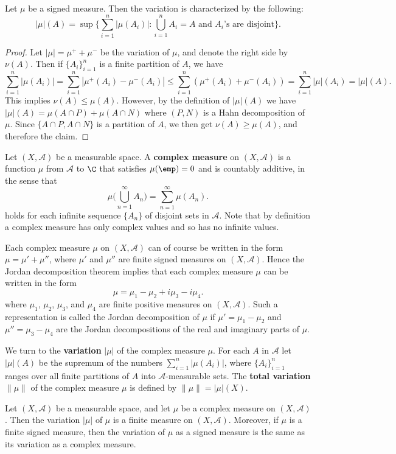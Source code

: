 \begin{proposition}\label{signed measure variation char}
Let $\mu$ be a signed measure. Then the variation is characterized by the following:
\[|\mu|(A)=\sup\{\sum_{i=1}^{n}|\mu(A_i)|:\bigcup_{i=1}^{n}A_i=A\text{ and $A_i$'s are disjoint}\}.\]
\end{proposition}
\begin{proof}
Let $|\mu|=\mu^++\mu^-$ be the variation of $\mu$, and denote the right side by $\nu(A)$. Then if $\{A_i\}_{i=1}^{n}$ is a finite partition of $A$, we have
\[\sum_{i=1}^{n}|\mu(A_i)|=\sum_{i=1}^{n}|\mu^+(A_i)-\mu^-(A_i)|\leq\sum_{i=1}^{n}(\mu^+(A_i)+\mu^-(A_i))=\sum_{i=1}^{n}|\mu|(A_i)=|\mu|(A).\]
This implies $\nu(A)\leq\mu(A)$. However, by the definition of $|\mu|(A)$ we have $|\mu|(A)=\mu(A\cap P)+\mu(A\cap N)$ where $(P,N)$ is a Hahn decomposition of $\mu$. Since $\{A\cap P,A\cap N\}$ is a partition of $A$, we then get $\nu(A)\geq\mu(A)$, and therefore the claim.
\end{proof}
Let $(X,\mathcal{A})$ be a measurable space. A \textbf{complex measure} on $(X,\mathcal{A})$ is a function $\mu$ from $\mathcal{A}$ to $\C$ that satisfies $\mu(\emp)=0$ and is countably additive, in the sense that
\[\mu\Big(\bigcup_{n=1}^{\infty}A_n\Big)=\sum_{n=1}^{\infty}\mu(A_n).\]
holds for each infinite sequence $\{A_n\}$ of disjoint sets in $\mathcal{A}$. Note that by definition a complex measure has only complex values and so has no infinite values.\par
Each complex measure $\mu$ on $(X,\mathcal{A})$ can of course be written in the form $\mu=\mu'+\mu''$, where $\mu'$ and $\mu''$ are finite signed measures on $(X,\mathcal{A})$. Hence the Jordan decomposition theorem implies that each complex measure $\mu$ can be written in the form
\[\mu=\mu_1-\mu_2+i\mu_3-i\mu_4.\]
where $\mu_1$, $\mu_2$, $\mu_3$, and $\mu_4$ are finite positive measures on $(X,\mathcal{A})$. Such a representation is called the Jordan decomposition of $\mu$ if $\mu'=\mu_1-\mu_2$ and $\mu''=\mu_3-\mu_4$ are the Jordan decompositions of the real and imaginary parts of $\mu$.\par
We turn to the \textbf{variation} $|\mu|$ of the complex measure $\mu$. For each $A$ in $\mathcal{A}$ let $|\mu|(A)$ be the supremum of the numbers $\sum_{i=1}^{n}|\mu(A_i)|$, where $\{A_i\}_{i=1}^{n}$ ranges over all finite partitions of $A$ into $\mathcal{A}$-measurable sets. The \textbf{total variation} $\|\mu\|$ of the complex measure $\mu$ is defined by $\|\mu\|=|\mu|(X)$.
\begin{proposition}
Let $(X,\mathcal{A})$ be a measurable space, and let $\mu$ be a complex measure on $(X,\mathcal{A})$. Then the variation $|\mu|$ of $\mu$ is a finite measure on $(X,\mathcal{A})$. Moreover, if $\mu$ is a finite signed measure, then the variation of $\mu$ as a signed measure is the same as its variation as a complex measure.
\end{proposition}
